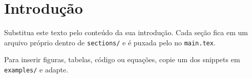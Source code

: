 \section{Introdução}

Substitua este texto pelo conteúdo da sua introdução. Cada seção fica em
um arquivo próprio dentro de \texttt{sections/} e é puxada pelo
\verb|| no \texttt{main.tex}.

Para inserir figuras, tabelas, código ou equações, copie um dos snippets
em \texttt{examples/} e adapte.
